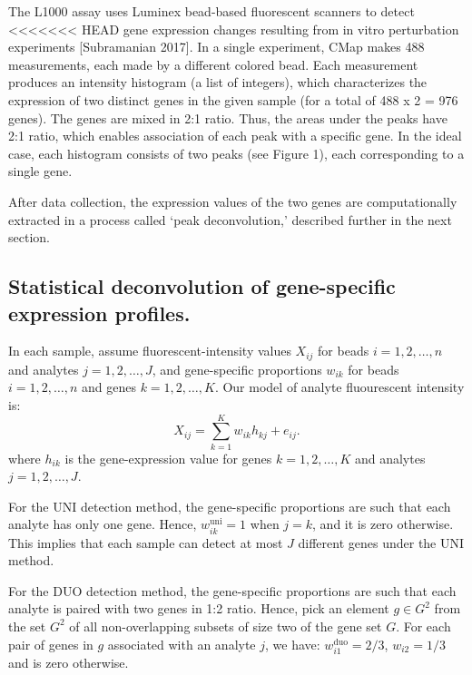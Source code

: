 \documentclass[]{article}
\begin{document}
The L1000 assay uses Luminex bead-based fluorescent scanners to detect
<<<<<<< HEAD
gene expression changes resulting from in vitro perturbation experiments
{[}Subramanian 2017{]}. In a single experiment, CMap makes 488
measurements, each made by a different colored bead. Each measurement
produces an intensity histogram (a list of integers), which
characterizes the expression of two distinct genes in the given sample
(for a total of 488 x 2 = 976 genes). The genes are mixed in 2:1 ratio.
Thus, the areas under the peaks have 2:1 ratio, which enables
association of each peak with a specific gene. In the ideal case, each
histogram consists of two peaks (see Figure 1), each corresponding to a
single gene.

After data collection, the expression values of the two genes are
computationally extracted in a process called `peak deconvolution,'
described further in the next section.

\hypertarget{statistical-deconvolution-of-gene-specific-expression-profiles.}{%
\subsection{Statistical deconvolution of gene-specific expression
profiles.}\label{statistical-deconvolution-of-gene-specific-expression-profiles.}}

In each sample, assume fluorescent-intensity values \(X_{ij}\) for beads
\(i=1,2,\dots, n\) and analytes \(j=1,2,\dots, J\), and gene-specific
proportions \(w_{ik}\) for beads \(i=1,2,\dots, n\) and genes
\(k=1,2,\dots, K\). Our model of analyte fluourescent intensity is: \[
  X_{ij} = \sum_{k=1}^{K} w_{ik} h_{kj} + e_{ij}. 
\] where \(h_{ik}\) is the gene-expression value for genes
\(k=1,2,\dots, K\) and analytes \(j=1,2,\dots, J\).

For the UNI detection method, the gene-specific proportions are such
that each analyte has only one gene. Hence, \(w^{\text{uni}}_{ik} = 1\)
when \(j = k\), and it is zero otherwise. This implies that each sample
can detect at most \(J\) different genes under the UNI method.

For the DUO detection method, the gene-specific proportions are such
that each analyte is paired with two genes in 1:2 ratio. Hence, pick an
element \(g\in G^2\) from the set \(G^2\) of all non-overlapping subsets
of size two of the gene set \(G\). For each pair of genes in \(g\)
associated with an analyte \(j\), we have:
\(w^{\text{duo}}_{i1} = 2/3\), \(w_{i2}=1/3\) and is zero otherwise.
\end{document}
